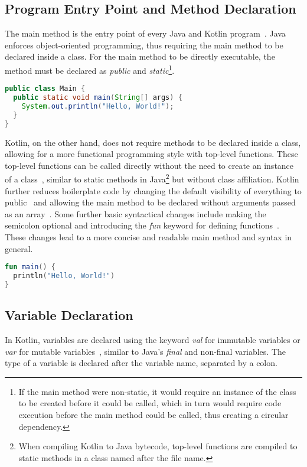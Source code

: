 \documentclass[a4paper, 11pt]{article}
\begin{document}
\subsection{Program Entry Point and Method Declaration}
The main method is the entry point of every Java and Kotlin program~\cite{program-entry-point}.
Java enforces object-oriented programming, thus requiring the main method to be declared inside a class.
For the main method to be directly executable, the method must be declared as \textit{public} and \textit{static}\footnote{If the main method were non-static, it would require an instance of the class to be created before it could be called, which in turn would require code execution before the main method could be called, thus creating a circular dependency.}.

\begin{lstlisting}[language=Java,title={Java main method}]
public class Main {
  public static void main(String[] args) {
    System.out.println("Hello, World!");
  }
}
\end{lstlisting}

Kotlin, on the other hand, does not require methods to be declared inside a class, allowing for a more functional programming style with top-level functions.
These top-level functions can be called directly without the need to create an instance of a class~\cite{kotlin-functions-scope}, similar to static methods in Java\footnote{When compiling Kotlin to Java bytecode, top-level functions are compiled to static methods in a class named after the file name.} but without class affiliation.
Kotlin further reduces boilerplate code by changing the default visibility of everything to public~\cite{visibility-modifiers} and allowing the main method to be declared without arguments passed as an array~\cite{program-entry-point}.
Some further basic syntactical changes include making the semicolon optional and introducing the \textit{fun} keyword for defining functions~\cite{functions}.
These changes lead to a more concise and readable main method and syntax in general.

\begin{lstlisting}[language=Kotlin,title={Kotlin main method}]
fun main() {
  println("Hello, World!")
}
\end{lstlisting}

\subsection{Variable Declaration}
In Kotlin, variables are declared using the keyword \textit{val} for immutable variables or \textit{var} for mutable variables~\cite{variables}, similar to Java's \textit{final} and non-final variables.
The type of a variable is declared after the variable name, separated by a colon.
\end{document}
